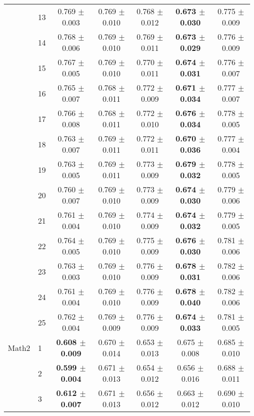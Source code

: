 \begin{table*}[t]
{\begin{tabular}{ll c c c c c}
        & 13 & 0.769 $\pm$ 0.003 & 0.769 $\pm$ 0.010 & 0.768 $\pm$ 0.012 & \textbf{0.673 $\pm$ 0.030} & 0.775 $\pm$ 0.009 \\
        & 14 & 0.768 $\pm$ 0.006 & 0.769 $\pm$ 0.010 & 0.769 $\pm$ 0.011 & \textbf{0.673 $\pm$ 0.029} & 0.776 $\pm$ 0.009 \\
        & 15 & 0.767 $\pm$ 0.005 & 0.769 $\pm$ 0.010 & 0.770 $\pm$ 0.011 & \textbf{0.674 $\pm$ 0.031} & 0.776 $\pm$ 0.007 \\
        & 16 & 0.765 $\pm$ 0.007 & 0.768 $\pm$ 0.011 & 0.772 $\pm$ 0.009 & \textbf{0.671 $\pm$ 0.034} & 0.777 $\pm$ 0.007 \\
        & 17 & 0.766 $\pm$ 0.008 & 0.768 $\pm$ 0.011 & 0.772 $\pm$ 0.010 & \textbf{0.676 $\pm$ 0.034} & 0.778 $\pm$ 0.005 \\
        & 18 & 0.763 $\pm$ 0.007 & 0.769 $\pm$ 0.011 & 0.772 $\pm$ 0.011 & \textbf{0.670 $\pm$ 0.036} & 0.777 $\pm$ 0.004 \\
        & 19 & 0.763 $\pm$ 0.005 & 0.769 $\pm$ 0.011 & 0.773 $\pm$ 0.009 & \textbf{0.679 $\pm$ 0.032} & 0.778 $\pm$ 0.005 \\
        & 20 & 0.760 $\pm$ 0.007 & 0.769 $\pm$ 0.010 & 0.773 $\pm$ 0.009 & \textbf{0.674 $\pm$ 0.030} & 0.779 $\pm$ 0.006 \\
        & 21 & 0.761 $\pm$ 0.004 & 0.769 $\pm$ 0.010 & 0.774 $\pm$ 0.009 & \textbf{0.674 $\pm$ 0.032} & 0.779 $\pm$ 0.005 \\
        & 22 & 0.764 $\pm$ 0.005 & 0.769 $\pm$ 0.010 & 0.775 $\pm$ 0.009 & \textbf{0.676 $\pm$ 0.030} & 0.781 $\pm$ 0.006 \\
        & 23 & 0.763 $\pm$ 0.003 & 0.769 $\pm$ 0.010 & 0.776 $\pm$ 0.009 & \textbf{0.678 $\pm$ 0.031} & 0.782 $\pm$ 0.006 \\
        & 24 & 0.761 $\pm$ 0.004 & 0.769 $\pm$ 0.010 & 0.776 $\pm$ 0.009 & \textbf{0.678 $\pm$ 0.040} & 0.782 $\pm$ 0.006 \\
        & 25 & 0.762 $\pm$ 0.004 & 0.769 $\pm$ 0.009 & 0.776 $\pm$ 0.009 & \textbf{0.674 $\pm$ 0.033} & 0.781 $\pm$ 0.005 \\
\midrule
Math2 & 1 & \textbf{0.608 $\pm$ 0.009} & 0.670 $\pm$ 0.014 & 0.653 $\pm$ 0.013 & 0.675 $\pm$ 0.008 & 0.685 $\pm$ 0.010 \\
        & 2 & \textbf{0.599 $\pm$ 0.004} & 0.671 $\pm$ 0.013 & 0.654 $\pm$ 0.012 & 0.656 $\pm$ 0.016 & 0.688 $\pm$ 0.011 \\
        & 3 & \textbf{0.612 $\pm$ 0.007} & 0.671 $\pm$ 0.013 & 0.656 $\pm$ 0.012 & 0.663 $\pm$ 0.012 & 0.690 $\pm$ 0.010 \\

\end{tabular}}
\end{table*}
